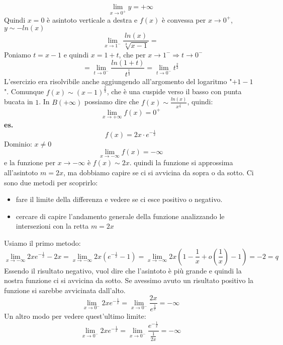 \[
    \lim_{x\rightarrow 0^+} y = + \infty
\]
Quindi $x= 0$ è asintoto verticale a destra e $f(x)$ è convessa per $x \rightarrow 0^+$, $y \sim -ln(x)$
\[
    \lim_{x\rightarrow 1^-} \frac{ln(x)}{\sqrt[3]{x-1}} =
\]
Poniamo $t = x-1$ e quindi $x= 1+t$, che per $x \rightarrow  1^- \Rightarrow t \rightarrow 0^-$
\[
    = \lim_{t\rightarrow 0^-} \frac{ln(1+t)}{t^{\frac{1}{3}}} = \lim_{t \rightarrow 0^-} t^{\frac{2}{3}}
\]
L'esercizio era risolvibile anche aggiungendo all'argomento del logaritmo "$+1-1$".\newline
Comunque $f(x) \sim (x-1)^{\frac{2}{3}}$, che è una cuspide verso il basso con punta bucata in $1$.\newline
\newline
In $B(+\infty)$ possiamo dire che $f(x) \sim  \frac{ln(x)}{x^{\frac{1}{3}}}$, quindi:
\[
    \lim_{x\rightarrow  +\infty} f(x) = 0^+
\]
\newline
\newline
\newline
\textbf{es.}
\[
    f(x) = 2x \cdot e ^{- \frac{1}{x}}
\] 
Dominio: $x\neq 0$
\[
    \lim_{x\rightarrow -\infty} f(x) = - \infty
\]
e la funzione per $x \rightarrow  -\infty$ è $f(x) \sim  2x$. quindi la funzione si approssima all'asintoto $m= 2x$, ma dobbiamo capire se ci si avvicina da sopra o da sotto. \newline
Ci sono due metodi per scoprirlo:
\begin{itemize}
    \item fare il limite della differenza e vedere se ci esce positivo o negativo.
    \item cercare di capire l'andamento generale della funzione analizzando le intersezioni con la retta $m = 2x$
\end{itemize}
Usiamo il primo metodo:
\[
    \lim_{x\rightarrow -\infty} 2xe^{-\frac{1}{x}}-2x = \lim_{x\rightarrow -\infty} 2x(e^{-\frac{1}{x}}-1) = \lim_{x\rightarrow -\infty} 2x(1-\frac{1}{x} + o(\frac{1}{x}) -1) = -2 = q
\]
Essendo il risultato negativo, vuol dire che l'asintoto è più grande e quindi la nostra funzione ci si avvicina da sotto. Se avessimo avuto un risultato positivo la funzione si sarebbe avvicinata dall'alto.
\[
    \lim_{x\rightarrow  0^-} 2x e ^{-\frac{1}{x}} = \lim_{x\rightarrow 0^-} \frac{2x}{e^{\frac{1}{x}}} = -\infty
\]
Un altro modo per vedere quest'ultimo limite:
\[
    \lim_{x\rightarrow  0^-} 2x e ^{-\frac{1}{x}} = \lim_{x\rightarrow 0^-} \frac{e^{-\frac{1}{x}}}{\frac{1}{2x}} = -\infty
\]
